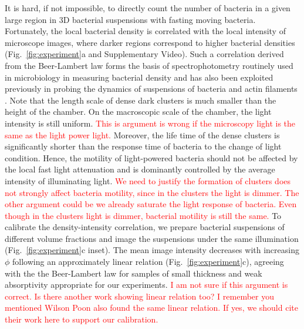 \documentclass[twocolumn,aps,prl,amsmath,amssymb,longbibliography]{revtex4-2}
\begin{document}
It is hard, if not impossible, to directly count the number of bacteria in a given large region in 3D bacterial suspensions with fasting moving bacteria. Fortunately, the local bacterial density is correlated with the local intensity of microscope images, where darker regions correspond to higher bacterial densities (Fig.~\ref{fig:experiment}a and Supplementary Video). Such a correlation derived from the Beer-Lambert law forms the basis of spectrophotometry routinely used in microbiology in measuring bacterial density \cite{Tortora2018} and has also been exploited previously in probing the dynamics of suspensions of bacteria and actin filaments \cite{Sokolov2009, Wilson2011, Schaller2013}. Note that the length scale of dense dark clusters is much smaller than the height of the chamber. On the macroscopic scale of the chamber, the light intensity is still uniform. \textcolor{red}{This is argument is wrong if the microscopy light is the same as the light power light.} Moreover, the life time of the dense clusters is significantly shorter than the response time of bacteria to the change of light condition. Hence, the motility of light-powered bacteria should not be affected by the local fast light attenuation and is dominantly controlled by the average intensity of illuminating light. \textcolor{red}{We need to justify the formation of clusters does not strongly affect bacteria motility, since in the clusters the light is dimmer. The other argument could be we already saturate the light response of bacteria. Even though in the clusters light is dimmer, bacterial motility is still the same.} To calibrate the density-intensity correlation, we prepare bacterial suspensions of different volume fractions and image the suspensions under the same illumination (Fig.~\ref{fig:experiment}c inset). The mean image intensity decreases with increasing $\phi$ following an approximately linear relation (Fig.~\ref{fig:experiment}c), agreeing with the the Beer-Lambert law for samples of small thickness and weak absorptivity appropriate for our experiments. \textcolor{red}{I am not sure if this argument is correct. Is there another work showing linear relation too? I remember you mentioned Wilson Poon also found the same linear relation. If yes, we should cite their work here to support our calibration.}
\end{document}
